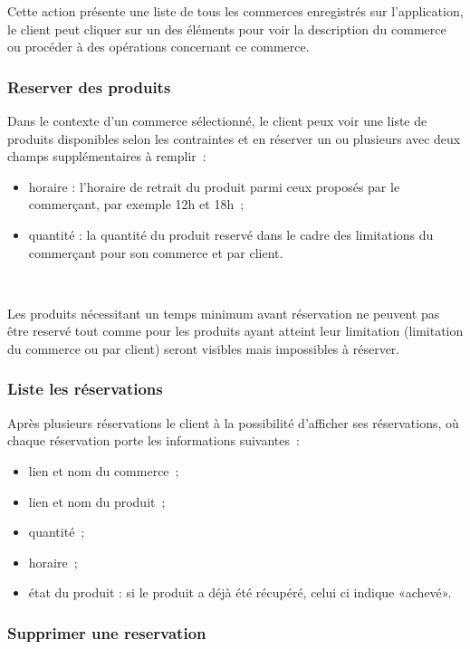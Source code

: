 \documentclass[a4paper,12pt]{article}
\begin{document}
Cette action présente une liste de tous les commerces enregistrés sur l'application, le client peut cliquer sur un des éléments pour voir la description du commerce ou procéder à des opérations concernant ce commerce.

\subsubsection{Reserver des produits}

Dans le contexte d'un commerce sélectionné, le client peux voir une liste de produits disponibles selon les contraintes et en réserver un ou plusieurs avec deux champs supplémentaires à remplir~:

\begin{itemize}
	\item horaire : l'horaire de retrait du produit parmi ceux proposés par le commerçant, par exemple 12h et 18h~;
	\item quantité : la quantité du produit reservé dans le cadre des limitations du commerçant pour son commerce et par client.
\end{itemize} \

Les produits nécessitant un temps minimum avant réservation ne peuvent pas être reservé tout comme pour les produits ayant atteint leur limitation (limitation du commerce ou par client) seront visibles mais impossibles à réserver.

\subsubsection{Liste les réservations}

Après plusieurs réservations le client à la possibilité d'afficher ses réservations, où chaque réservation porte les informations suivantes~:

\begin{itemize}
	\item lien et nom du commerce~;
	\item lien et nom du produit~;
	\item quantité~;
	\item horaire~;
	\item état du produit : si le produit a déjà été récupéré, celui ci indique «achevé».
\end{itemize}


\subsubsection{Supprimer une reservation}
\end{document}
